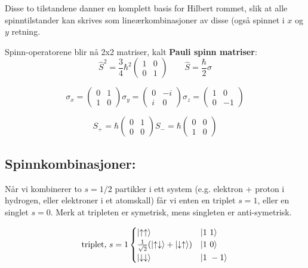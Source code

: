 \documentclass[10p,a4paper]{extarticle}
\begin{document}
\begin{multicols}{2}
Disse to tilstandene danner en komplett basis for Hilbert rommet, slik at alle spinntilstander kan skrives som lineærkombinasjoner av disse (også spinnet i $x$ og $y$ retning.

Spinn-operatorene blir nå 2x2 matriser, kalt \textbf{Pauli spinn matriser}:
\begin{equation*}
\hat{S}^2 = \frac{3}{4}\hbar^2
\begin{pmatrix}
1 & 0\\
0 & 1
\end{pmatrix} \quad \quad
\hat{S} = \frac{\hbar}{2}\sigma
\end{equation*}

\begin{equation*}
\sigma_x =
\begin{pmatrix}
0 & 1\\
1 & 0
\end{pmatrix}
\sigma_y =
\begin{pmatrix}
0 & -i\\
i & 0
\end{pmatrix}
\sigma_z =
\begin{pmatrix}
1 & 0\\
0 & -1
\end{pmatrix}
\end{equation*}

\begin{equation*}
S_+ = \hbar
\begin{pmatrix}
0 & 1\\
0 & 0
\end{pmatrix}
S_- = \hbar
\begin{pmatrix}
0 & 0\\
1 & 0
\end{pmatrix}
\end{equation*}

\subsection*{Spinnkombinasjoner:}
Når vi kombinerer to $s = 1/2$ partikler i ett system (e.g. elektron + proton i hydrogen, eller elektroner i et atomskall) får vi enten en triplet $s = 1$, eller en singlet $s = 0$. Merk at tripleten er symetrisk, mens singleten er anti-symetrisk.

\begin{align*}
\text{triplet, } s = 1
\begin{cases}
\ket{\uparrow \uparrow} & \ket{1\ 1}\\
\tfrac{1}{\sqrt{2}}(\ket{\uparrow \downarrow} + \ket{\downarrow \uparrow}) & \ket{1\ 0}\\
\ket{\downarrow \downarrow} & \ket{1\ -1}
\end{cases}
\end{align*}


\end{multicols}
\end{document}
